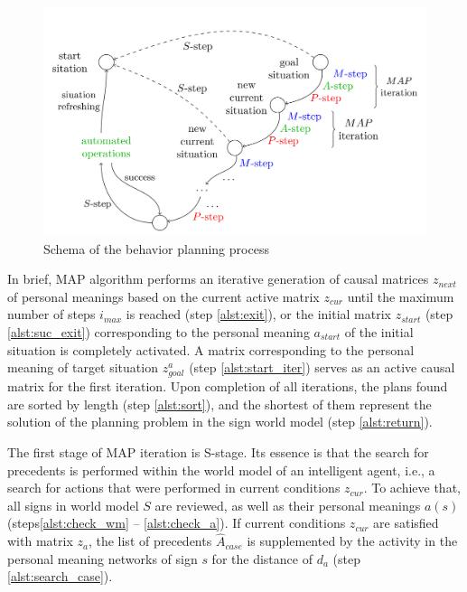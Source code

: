 \documentclass[review]{elsarticle}
\begin{document}
\begin{figure}
	\centering
	\includegraphics[width=\textwidth]{beh_plan2_en}
	\caption{Schema of the behavior planning process}	
	\label{fig:plan_algo}	
\end{figure}

In brief, MAP algorithm performs an iterative generation of causal matrices $z_{next}$ of personal meanings based on the current active matrix $z_{cur}$ until the maximum number of steps $i_{max}$ is reached (step \ref{alst:exit}), or the initial matrix $z_{start}$ (step \ref{alst:suc_exit}) corresponding to the personal meaning $a_{start}$ of the initial situation is completely activated. A matrix corresponding to the personal meaning of target situation $z_{goal}^a$ (step \ref{alst:start_iter}) serves as an active causal matrix for the first iteration. Upon completion of all iterations, the plans found are sorted by length (step \ref{alst:sort}), and the shortest of them represent the solution of the planning problem in the sign world model (step \ref{alst:return}).

The first stage of MAP iteration is S-stage. Its essence is that the search for precedents is performed within the world model of an intelligent agent, i.e., a search for actions that were performed in current conditions $z_{cur}$. To achieve that, all signs in world model $S$ are reviewed, as well as their personal meanings $a(s)$ (steps\ref{alst:check_wm} -- \ref{alst:check_a}). If current conditions $z_{cur}$ are satisfied with matrix $z_a$, the list of precedents $\hat A_{case}$ is supplemented by the activity in the personal meaning networks of sign $s$ for the distance of $d_a$ (step \ref{alst:search_case}).
\end{document}
